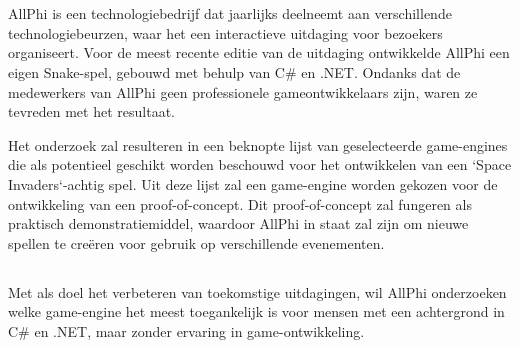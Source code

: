 
\chapter{}%
\label{ch:inleiding}



\section{}%
\label{sec:probleemstelling}

AllPhi is een technologiebedrijf dat jaarlijks deelneemt aan verschillende technologiebeurzen, waar het een interactieve uitdaging voor bezoekers organiseert. Voor de meest recente editie van de uitdaging ontwikkelde AllPhi een eigen Snake-spel, gebouwd met behulp van C\# en .NET. Ondanks dat de medewerkers van AllPhi geen professionele gameontwikkelaars zijn, waren ze tevreden met het resultaat.

Het onderzoek zal resulteren in een beknopte lijst van geselecteerde game-engines die als potentieel geschikt worden beschouwd voor het ontwikkelen van een `Space Invaders`-achtig spel. Uit deze lijst zal een game-engine worden gekozen voor de ontwikkeling van een proof-of-concept. Dit proof-of-concept zal fungeren als praktisch demonstratiemiddel, waardoor AllPhi in staat zal zijn om nieuwe spellen te creëren voor gebruik op verschillende evenementen.


\section{}%
\label{sec:onderzoeksvraag}

Met als doel het verbeteren van toekomstige uitdagingen, wil AllPhi onderzoeken welke game-engine het meest toegankelijk is voor mensen met een achtergrond in C\# en .NET, maar zonder ervaring in game-ontwikkeling.

\section{}%
\label{sec:onderzoeksdoelstelling}

